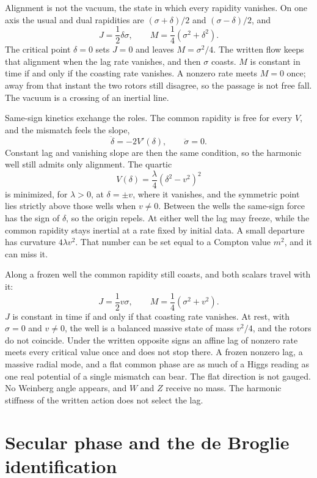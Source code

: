 \documentclass[a4paper]{article}
\begin{document}
Alignment is not the vacuum, the state in which every rapidity vanishes. On one axis the usual and dual rapidities are \((\sigma+\delta)/2\) and \((\sigma-\delta)/2\), and
\[
J=\frac12\delta\sigma,\qquad M=\frac14(\sigma^2+\delta^2).
\]
The critical point \(\delta=0\) sets \(J=0\) and leaves \(M=\sigma^2/4\). The written flow keeps that alignment when the lag rate vanishes, and then \(\sigma\) coasts. \(M\) is constant in time if and only if the coasting rate vanishes. A nonzero rate meets \(M=0\) once; away from that instant the two rotors still disagree, so the passage is not free fall. The vacuum is a crossing of an inertial line.

Same-sign kinetics exchange the roles. The common rapidity is free for every \(V\), and the mismatch feels the slope,
\[
\ddot\delta=-2V'(\delta),\qquad\ddot\sigma=0.
\]
Constant lag and vanishing slope are then the same condition, so the harmonic well still admits only alignment. The quartic
\[
V(\delta)=\frac\lambda4(\delta^2-v^2)^2
\]
is minimized, for \(\lambda>0\), at \(\delta=\pm v\), where it vanishes, and the symmetric point lies strictly above those wells when \(v\neq 0\). Between the wells the same-sign force has the sign of \(\delta\), so the origin repels. At either well the lag may freeze, while the common rapidity stays inertial at a rate fixed by initial data. A small departure has curvature \(4\lambda v^2\). That number can be set equal to a Compton value \(m^2\), and it can miss it.

Along a frozen well the common rapidity still coasts, and both scalars travel with it:
\[
J=\frac12 v\sigma,\qquad M=\frac14(\sigma^2+v^2).
\]
\(J\) is constant in time if and only if that coasting rate vanishes. At rest, with \(\sigma=0\) and \(v\neq 0\), the well is a balanced massive state of mass \(v^2/4\), and the rotors do not coincide. Under the written opposite signs an affine lag of nonzero rate meets every critical value once and does not stop there. A frozen nonzero lag, a massive radial mode, and a flat common phase are as much of a Higgs reading as one real potential of a single mismatch can bear. The flat direction is not gauged. No Weinberg angle appears, and \(W\) and \(Z\) receive no mass. The harmonic stiffness of the written action does not select the lag.

\section{Secular phase and the de Broglie identification}
\end{document}
